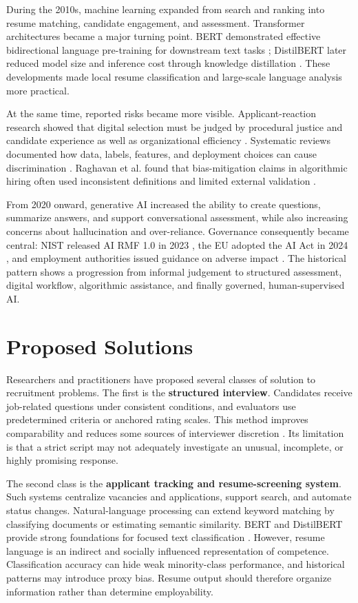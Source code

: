 \documentclass[12pt,a4paper,oneside]{report}
\renewcommand{\cite}[1]{}
\begin{document}
During the 2010s, machine learning expanded from search and ranking into resume
matching, candidate engagement, and assessment. Transformer architectures became a
major turning point. BERT demonstrated effective bidirectional language pre-training
for downstream text tasks \cite{devlin2019}; DistilBERT later reduced model size and
inference cost through knowledge distillation \cite{sanh2019}. These developments made
local resume classification and large-scale language analysis more practical.

At the same time, reported risks became more visible. Applicant-reaction research
showed that digital selection must be judged by procedural justice and candidate
experience as well as organizational efficiency \cite{gilliland1993,woods2020}.
Systematic reviews documented how data, labels, features, and deployment choices can
cause discrimination \cite{kochling2020}. Raghavan et al. found that bias-mitigation
claims in algorithmic hiring often used inconsistent definitions and limited external
validation \cite{raghavan2020}.

From 2020 onward, generative AI increased the ability to create questions, summarize
answers, and support conversational assessment, while also increasing concerns about
hallucination and over-reliance. Governance consequently became central: NIST released
AI RMF 1.0 in 2023 \cite{nist2023}, the EU adopted the AI Act in 2024
\cite{eu2024}, and employment authorities issued guidance on adverse impact
\cite{eeoc2023}. The historical pattern shows a progression from informal judgement to
structured assessment, digital workflow, algorithmic assistance, and finally
governed, human-supervised AI.

\clearpage
\section{Proposed Solutions}

Researchers and practitioners have proposed several classes of solution to recruitment
problems. The first is the \textbf{structured interview}. Candidates receive
job-related questions under consistent conditions, and evaluators use predetermined
criteria or anchored rating scales. This method improves comparability and reduces
some sources of interviewer discretion \cite{campion1997}. Its limitation is that a
strict script may not adequately investigate an unusual, incomplete, or highly
promising response.

The second class is the \textbf{applicant tracking and resume-screening system}. Such
systems centralize vacancies and applications, support search, and automate status
changes. Natural-language processing can extend keyword matching by classifying
documents or estimating semantic similarity. BERT and DistilBERT provide strong
foundations for focused text classification \cite{devlin2019,sanh2019}. However,
resume language is an indirect and socially influenced representation of competence.
Classification accuracy can hide weak minority-class performance, and historical
patterns may introduce proxy bias. Resume output should therefore organize information
rather than determine employability.
\end{document}
